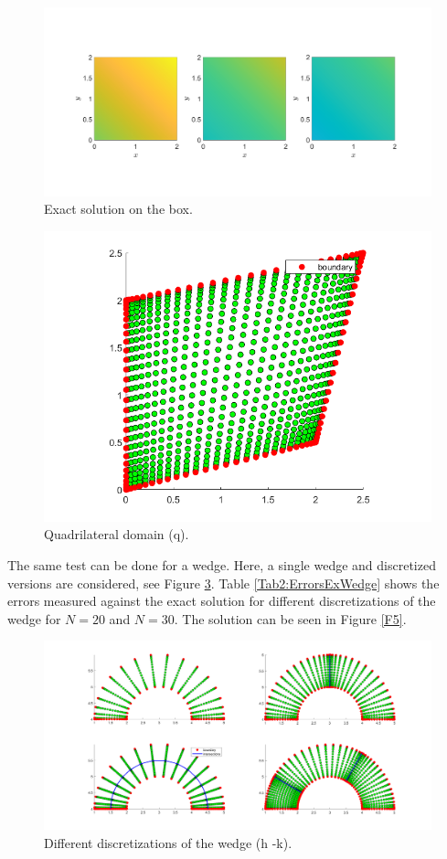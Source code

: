 \documentclass[11pt, a4paper]{article}
\theoremstyle{definition}
\begin{document}
	\begin{figure}[h]
		\centering
		\includegraphics[scale=0.35]{boxEx.png}
		\caption{Exact solution on the box.} 
		\label{F3}
	\end{figure}
	\begin{figure}[h]
		\centering
		\includegraphics[scale=0.35]{quad.png}
		\caption{Quadrilateral domain (q).} 
		\label{F3a}
	\end{figure}

The same test can be done for a wedge. Here, a single wedge and discretized versions are considered, see Figure \ref{F4}. Table \ref{Tab2:ErrorsExWedge} shows the errors measured against the exact solution for different discretizations of the wedge for $N = 20$ and $N = 30$. The solution can be seen in Figure \ref{F5}.
\begin{figure}[h]
	\centering
	\includegraphics[scale=0.35]{WedgeSections.png}
	\caption{Different discretizations of the wedge (h -k).} 
	\label{F4}
\end{figure}
\end{document}
